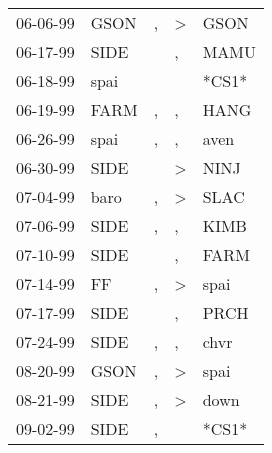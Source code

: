 \begin{supertabular}{p{0.07\textwidth}p{0.06\textwidth}p{0.02\textwidth}p{0.02\textwidth}p{0.06\textwidth}}
 06-06-99\textsuperscript{} &           GSON\textsuperscript{} &                , &     \textgreater &           GSON\textsuperscript{} \\
 06-17-99\textsuperscript{} &           SIDE\textsuperscript{} &                  &                , &           MAMU\textsuperscript{} \\
 06-18-99\textsuperscript{} &           spai\textsuperscript{} &                  &                  &                            *CS1* \\
 06-19-99\textsuperscript{} &           FARM\textsuperscript{} &                , &                , &           HANG\textsuperscript{} \\
 06-26-99\textsuperscript{} &           spai\textsuperscript{} &                , &                , &           aven\textsuperscript{} \\
 06-30-99\textsuperscript{} &           SIDE\textsuperscript{} &                  &     \textgreater &           NINJ\textsuperscript{} \\
 07-04-99\textsuperscript{} &           baro\textsuperscript{} &                , &     \textgreater &           SLAC\textsuperscript{} \\
 07-06-99\textsuperscript{} &           SIDE\textsuperscript{} &                , &                , &           KIMB\textsuperscript{} \\
 07-10-99\textsuperscript{} &           SIDE\textsuperscript{} &                  &                , &           FARM\textsuperscript{} \\
 07-14-99\textsuperscript{} &             FF\textsuperscript{} &                , &     \textgreater &           spai\textsuperscript{} \\
 07-17-99\textsuperscript{} &           SIDE\textsuperscript{} &                  &                , &           PRCH\textsuperscript{} \\
 07-24-99\textsuperscript{} &           SIDE\textsuperscript{} &                , &                , &           chvr\textsuperscript{} \\
 08-20-99\textsuperscript{} &           GSON\textsuperscript{} &                , &     \textgreater &           spai\textsuperscript{} \\
 08-21-99\textsuperscript{} &           SIDE\textsuperscript{} &                , &     \textgreater &           down\textsuperscript{} \\
 09-02-99\textsuperscript{} &           SIDE\textsuperscript{} &                , &                  &                            *CS1* \\

\end{supertabular}
